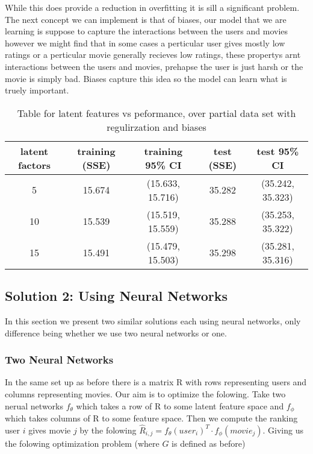 \documentclass{article}
\begin{document}
While this does provide a reduction in overfitting it is sill a significant problem. The next concept we can implement is that of biases, our model that we are learning is suppose to capture the interactions between the users and movies however we might find that in some cases a perticular user gives mostly low ratings or a perticular movie generally recieves low ratings, these propertys arnt interactions between the users and movies, prehapse the user is just harsh or the movie is simply bad. Biases capture this idea so the model can learn what is truely important.

\begin{table}[H]
\centering
\begin{tabular}{| c | c | c | c | c |}
\hline
latent factors & training (SSE) &  training 95\% CI & test (SSE) &  test 95\% CI  \\
\hline
\hline
5 & 15.674 & (15.633, 15.716) & 35.282 & (35.242, 35.323)\\
10 & 15.539 & (15.519, 15.559) & 35.288 & (35.253, 35.322)\\
15 & 15.491 & (15.479, 15.503) & 35.298 & (35.281, 35.316)\\
\hline
\end{tabular}
\caption{Table for latent features vs peformance, over partial data set with regulirzation and biases}
\end{table}

\subsection{Solution 2: Using Neural Networks}

In this section we present two similar solutions each using neural networks, only difference being whether we use two neural networks or one.

\subsubsection{Two Neural Networks}
In the same set up as before there is a matrix R with rows representing users and columns representing movies. Our aim is to optimize the folowing. Take two nerual networks $f_{\theta}$ which takes a row of R to some latent feature space and $f_{\phi}$ which takes columns of R to some feature space. Then we compute the ranking user $i$ gives movie $j$ by the folowing $\hat{R}_{i,j} = f_{\theta}(user_i)^T \cdot f_{\phi}(movie_j)$. Giving us the folowing optimization problem (where $G$ is defined as before)
\end{document}
